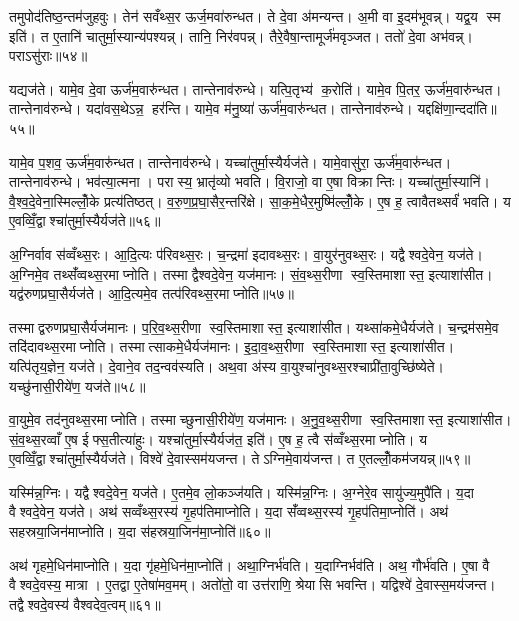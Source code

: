तमुपोद॑तिष्ठ॒न्तम॑जुहवुः। तेन॑ सवँथ्स॒र ऊर्ज॒मवा॑रुन्धत। ते दे॒वा अ॑मन्यन्त। अ॒मी वा इ॒दम॑भूवन्न्। यद्व॒य स्म इति॑। त ए॒तानि॑ चातुर्मा॒स्यान्य॑पश्यन्न्। तानि॒ निर॑वपन्न्। तैरे॒वैषा॒न्तामूर्ज॑मवृञ्जत। ततो॑ दे॒वा अभ॑वन्न्। पराऽसु॑राः॥५४॥

यद्यज॑ते। यामे॒व दे॒वा ऊर्ज॑म॒वारु॑न्धत। तान्तेनाव॑रुन्धे। यत्पि॒तृभ्य॑ क॒रोति॑। यामे॒व पि॒तर॒ ऊर्ज॑म॒वारु॑न्धत। तान्तेनाव॑रुन्धे। यदा॑वस॒थेऽन्न॒ हर॑न्ति। यामे॒व म॑नु॒ष्या॑ ऊर्ज॑म॒वारु॑न्धत। तान्तेनाव॑रुन्धे। यद्दक्षि॑णा॒न्ददा॑ति॥५५॥

यामे॒व प॒शव॒ ऊर्ज॑म॒वारु॑न्धत। तान्तेनाव॑रुन्धे। यच्चा॑तुर्मा॒स्यैर्यज॑ते। यामे॒वासु॑रा॒ ऊर्ज॑म॒वारु॑न्धत। तान्तेनाव॑रुन्धे। भव॑त्या॒त्मना। परास्य॒ भ्रातृ॑व्यो भवति। वि॒राजो॒ वा ए॒षा विक्रान्तिः। यच्चा॑तुर्मा॒स्यानि॑। वै॒श्व॒दे॒वेना॒स्मिल्लोँ॒के प्रत्य॑तिष्ठत्। व॒रु॒ण॒प्र॒घा॒सैर॒न्तरि॑क्षे। सा॒क॒मे॒धैर॒मुष्मि॑ल्लोँ॒के। ए॒ष ह॒ त्वावैतथ्सर्वं॑ भवति। य ए॒वव्विँ॒द्वाश्चा॑तुर्मा॒स्यैर्यज॑ते॥५६॥

अ॒ग्निर्वाव स॑व्वँथ्स॒रः। आ॒दि॒त्यः प॑रिवथ्स॒रः। च॒न्द्रमा॑ इदावथ्स॒रः। वा॒युर॑नुवथ्स॒रः। यद्वैश्वदे॒वेन॒ यज॑ते। अ॒ग्निमे॒व तथ्सँ॑व्वथ्स॒रमाप्नोति। तस्माद्वैश्वदे॒वेन॒ यज॑मानः। सं॒व॒थ्स॒रीणा स्व॒स्तिमाशास्त॒ इत्याशा॑सीत। यद्व॑रुणप्रघा॒सैर्यज॑ते। आ॒दि॒त्यमे॒व तत्प॑रिवथ्स॒रमाप्नोति॥५७॥

तस्माद्वरुणप्रघा॒सैर्यज॑मानः। प॒रि॒व॒थ्स॒रीणा स्व॒स्तिमाशास्त॒ इत्याशा॑सीत। यथ्सा॑कमे॒धैर्यज॑ते। च॒न्द्रम॑समे॒व तदि॑दावथ्स॒रमाप्नोति। तस्मात्साकमे॒धैर्यज॑मानः। इ॒दा॒व॒थ्स॒रीणा स्व॒स्तिमाशास्त॒ इत्याशा॑सीत। यत्पि॑तृय॒ज्ञेन॒ यज॑ते। दे॒वाने॒व तद॒न्वव॑स्यति। अथ॒वा अ॑स्य वा॒युश्चा॑नुवथ्स॒रश्चाप्री॑ता॒वुच्छि॑ष्येते। यच्छु॑नासी॒रीये॑ण॒ यज॑ते॥५८॥

वा॒युमे॒व तद॑नुवथ्स॒रमाप्नोति। तस्माच्छुनासी॒रीये॑ण॒ यज॑मानः। अ॒नु॒व॒थ्स॒रीणा स्व॒स्तिमाशास्त॒ इत्याशा॑सीत। सं॒व॒थ्स॒रव्वाँ ए॒ष ईफ्स॒तीत्या॑हुः। यश्चा॑तुर्मा॒स्यैर्यज॑त॒ इति॑। ए॒ष ह॒ त्वै स॑व्वँथ्स॒रमाप्नोति। य ए॒वव्विँ॒द्वाश्चा॑तुर्मा॒स्यैर्यज॑ते। विश्वे॑ दे॒वास्सम॑यजन्त। तेऽग्निमे॒वाय॑जन्त। त ए॒तल्लोँ॒कम॑जयन्न्॥५९॥

यस्मि॑न्न॒ग्निः। यद्वैश्वदे॒वेन॒ यज॑ते। ए॒तमे॒व लो॒कञ्ज॑यति। यस्मि॑न्न॒ग्निः। अ॒ग्नेरे॒व सायु॑ज्य॒मुपै॑ति। य॒दा वैश्वदे॒वेन॒ यज॑ते। अथ॑ सव्वँथ्स॒रस्य॑ गृ॒हप॑तिमाप्नोति। य॒दा सँ॑व्वथ्स॒रस्य॑ गृ॒हप॑तिमा॒प्नोति॑। अथ॑ सहस्रया॒जिन॑माप्नोति। य॒दा स॑हस्रया॒जिन॑मा॒प्नोति॑॥६०॥

अथ॑ गृहमे॒धिन॑माप्नोति। य॒दा गृ॑हमे॒धिन॑मा॒प्नोति॑। अथा॒ग्निर्भ॑वति। य॒दाग्निर्भव॑ति। अथ॒ गौर्भ॑वति। ए॒षा वै वैश्वदे॒वस्य॒ मात्रा। ए॒तद्वा ए॒तेषा॑मव॒मम्। अतो॑तो॒ वा उत्त॑राणि॒ श्रेयासि भवन्ति। यद्विश्वे॑ दे॒वास्स॒मय॑जन्त। तद्वैश्वदे॒वस्य॑ वैश्वदेव॒त्वम्॥६१॥

